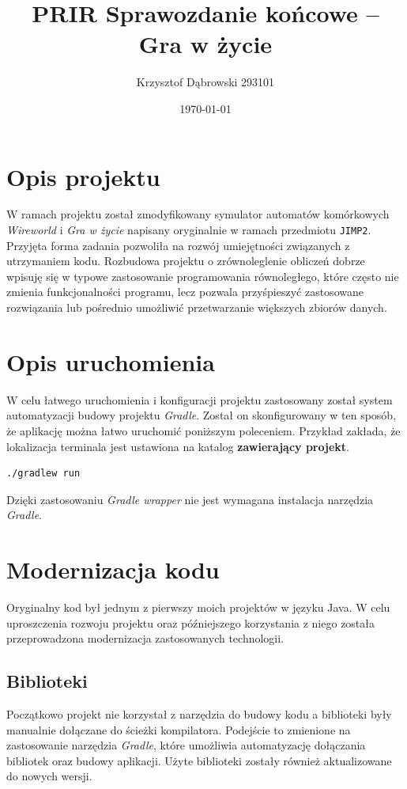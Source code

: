 \documentclass{mwart}
\title{PRIR Sprawozdanie końcowe -- Gra w życie}
\author{Krzysztof Dąbrowski 293101}
\date{\today}
\begin{document}
\maketitle{}

\tableofcontents{}

\section{Opis projektu}
W ramach projektu został zmodyfikowany symulator automatów komórkowych \textit{Wireworld} i \textit{Gra w życie} napisany oryginalnie w ramach przedmiotu \texttt{JIMP2}. Przyjęta forma zadania pozwoliła na rozwój umiejętności związanych z utrzymaniem kodu. Rozbudowa projektu o zrównoleglenie obliczeń dobrze wpisuję się w typowe zastosowanie programowania równoległego, które często nie zmienia funkcjonalności programu, lecz pozwala przyśpieszyć zastosowane rozwiązania lub pośrednio umożliwić przetwarzanie większych zbiorów danych.

\section{Opis uruchomienia}
W celu łatwego uruchomienia i konfiguracji projektu zastosowany został system automatyzacji budowy projektu \textit{Gradle}. Został on skonfigurowany w ten sposób, że aplikację można łatwo uruchomić poniższym poleceniem. Przykład zakłada, że lokalizacja terminala jest ustawiona na katalog \textbf{zawierający projekt}.

\begin{lstlisting}[language=bash]
./gradlew run 
\end{lstlisting}

Dzięki zastosowaniu \textit{Gradle wrapper} nie jest wymagana instalacja narzędzia \textit{Gradle}.

\section{Modernizacja kodu}
Oryginalny kod był jednym z pierwszy moich projektów w języku Java. W celu uproszczenia rozwoju projektu oraz późniejszego korzystania z niego została przeprowadzona modernizacja zastosowanych technologii.

\subsection*{Biblioteki}
Początkowo projekt nie korzystał z narzędzia do budowy kodu a biblioteki były manualnie dołączane do ścieżki kompilatora. Podejście to zmienione na zastosowanie narzędzia \textit{Gradle}, które umożliwia automatyzację dołączania bibliotek oraz budowy aplikacji. Użyte biblioteki zostały również aktualizowane do nowych wersji.
\end{document}
